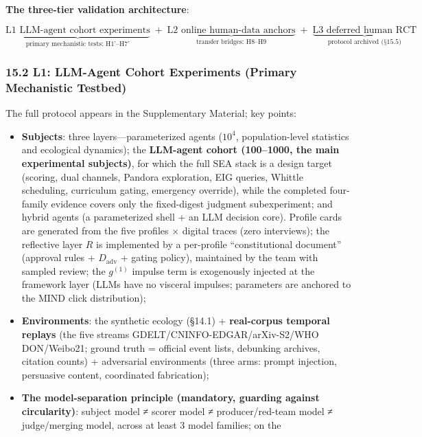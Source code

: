 \documentclass[
  11pt]{article}
\providecommand{\tightlist}{%
  \setlength{\itemsep}{0pt}\setlength{\parskip}{0pt}}
\begin{document}
\textbf{The three-tier validation architecture}:

\[\underbrace{\text{L1 LLM-agent cohort experiments}}_{\text{primary mechanistic tests: H1'–H7'}} \;+\; \underbrace{\text{L2 online human-data anchors}}_{\text{transfer bridges: H8–H9}} \;+\; \underbrace{\text{L3 deferred human RCT}}_{\text{protocol archived (§15.5)}}\]

\subsubsection{15.2 L1: LLM-Agent Cohort Experiments (Primary
Mechanistic
Testbed)}\label{l1-llm-agent-cohort-experiments-primary-mechanistic-testbed}

The full protocol appears in the Supplementary Material; key points:

\begin{itemize}
\tightlist
\item
  \textbf{Subjects}: three layers---parameterized agents (\(10^4\),
  population-level statistics and ecological dynamics); the
  \textbf{LLM-agent cohort (100--1000, the main experimental subjects)},
  for which the full SEA stack is a design target (scoring, dual
  channels, Pandora exploration, EIG queries, Whittle scheduling,
  curriculum gating, emergency override), while the completed
  four-family evidence covers only the fixed-digest judgment
  subexperiment; and hybrid agents (a parameterized shell + an LLM
  decision core). Profile cards are generated from the five profiles ×
  digital traces (zero interviews); the reflective layer \(R\) is
  implemented by a per-profile ``constitutional document'' (approval
  rules + \(D_{\mathrm{adv}}\) + gating policy), maintained by the team
  with sampled review; the \(g^{(1)}\) impulse term is exogenously
  injected at the framework layer (LLMs have no visceral impulses;
  parameters are anchored to the MIND click distribution);
\item
  \textbf{Environments}: the synthetic ecology (§14.1) +
  \textbf{real-corpus temporal replays} (the five streams
  GDELT/CNINFO-EDGAR/arXiv-S2/WHO DON/Weibo21; ground truth = official
  event lists, debunking archives, citation counts) + adversarial
  environments (three arms: prompt injection, persuasive content,
  coordinated fabrication);
\item
  \textbf{The model-separation principle (mandatory, guarding against
  circularity)}: subject model ≠ scorer model ≠ producer/red-team model
  ≠ judge/merging model, across at least 3 model families; on the

\end{itemize}
\end{document}

